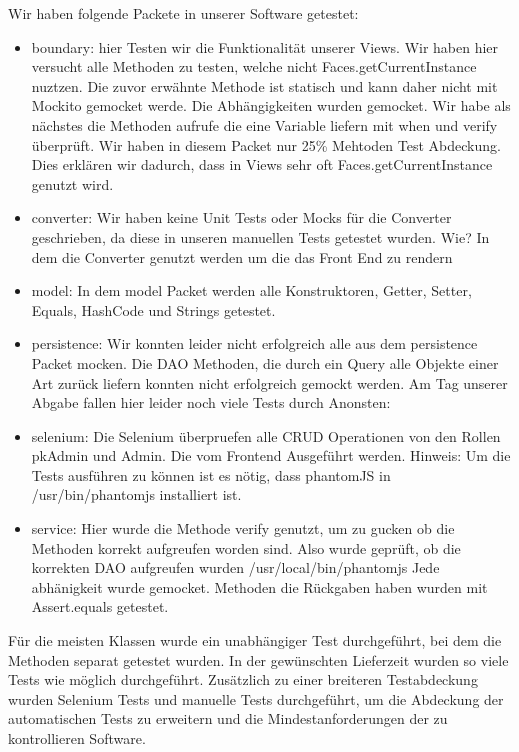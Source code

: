 \documentclass[enabledeprecatedfontcommands,fontsize=12pt,paper=a4,twoside]{scrartcl}
\begin{document}
Wir haben folgende Packete in unserer Software getestet:
\begin{itemize}
  \item boundary: hier Testen wir die Funktionalität unserer Views. Wir haben
  hier versucht alle Methoden zu testen, welche nicht Faces.getCurrentInstance
  nuztzen. Die zuvor erwähnte Methode ist statisch und kann daher nicht mit
  Mockito gemocket werde. Die Abhängigkeiten wurden gemocket. Wir habe als
  nächstes die Methoden aufrufe die eine Variable liefern mit when und verify
  überprüft.
  Wir haben in diesem Packet nur 25\% Mehtoden Test Abdeckung. Dies erklären wir
  dadurch, dass in Views sehr oft Faces.getCurrentInstance genutzt wird.

  \item converter: Wir haben keine Unit Tests oder Mocks für die Converter
  geschrieben, da diese in unseren manuellen Tests getestet wurden. Wie? In dem
  die Converter genutzt werden um die das Front End zu rendern

  \item model: In dem model Packet werden alle Konstruktoren, Getter, Setter, Equals, HashCode
  und Strings getestet.

  \item persistence: Wir konnten leider nicht erfolgreich alle aus dem
  persistence Packet mocken. Die DAO Methoden, die durch ein Query alle Objekte
  einer Art zurück liefern konnten nicht erfolgreich gemockt werden. Am Tag
  unserer Abgabe fallen hier leider noch viele Tests durch
  Anonsten: %

  \item selenium: Die Selenium überpruefen alle CRUD Operationen von den Rollen pkAdmin
  und Admin. Die vom Frontend Ausgeführt werden. Hinweis: Um die Tests ausführen
  zu können ist es nötig, dass phantomJS in /usr/bin/phantomjs installiert ist.

  \item service: Hier wurde die Methode verify genutzt, um zu gucken ob die
  Methoden korrekt aufgreufen worden sind. Also wurde geprüft, ob die korrekten
  DAO aufgreufen wurden /usr/local/bin/phantomjs
  Jede abhänigkeit wurde gemocket. Methoden die Rückgaben haben wurden mit
  Assert.equals getestet.
  \end{itemize}

Für die meisten Klassen wurde ein unabhängiger Test durchgeführt, bei dem die Methoden separat getestet wurden. In der gewünschten  Lieferzeit wurden so viele Tests wie möglich durchgeführt. Zusätzlich zu einer breiteren Testabdeckung wurden Selenium Tests und manuelle Tests durchgeführt, um die Abdeckung der automatischen Tests zu erweitern und die Mindestanforderungen der zu kontrollieren Software.
\end{document}
